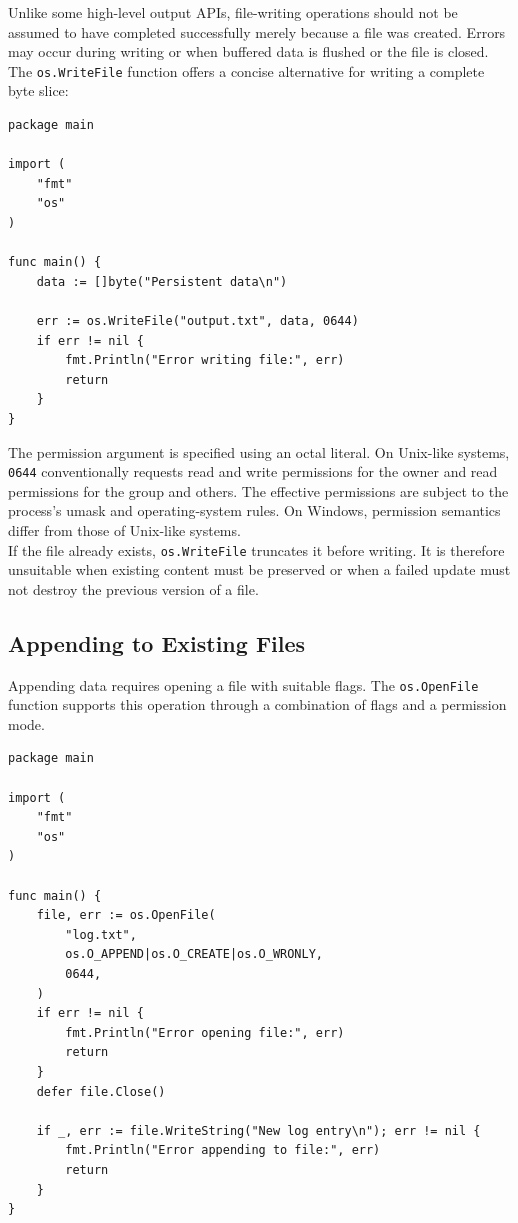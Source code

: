 Unlike some high-level output APIs, file-writing operations should not be assumed to have completed successfully merely because a file was created. Errors may occur during writing or when buffered data is flushed or the file is closed.\\

The \texttt{os.WriteFile} function offers a concise alternative for writing a complete byte slice:

\begin{lstlisting}
package main

import (
    "fmt"
    "os"
)

func main() {
    data := []byte("Persistent data\n")

    err := os.WriteFile("output.txt", data, 0644)
    if err != nil {
        fmt.Println("Error writing file:", err)
        return
    }
}
\end{lstlisting}

The permission argument is specified using an octal literal. On Unix-like systems, \texttt{0644} conventionally requests read and write permissions for the owner and read permissions for the group and others. The effective permissions are subject to the process's umask and operating-system rules. On Windows, permission semantics differ from those of Unix-like systems.\\

If the file already exists, \texttt{os.WriteFile} truncates it before writing. It is therefore unsuitable when existing content must be preserved or when a failed update must not destroy the previous version of a file.\\

\subsection{Appending to Existing Files}

Appending data requires opening a file with suitable flags. The \texttt{os.OpenFile} function supports this operation through a combination of flags and a permission mode.

\begin{lstlisting}
package main

import (
    "fmt"
    "os"
)

func main() {
    file, err := os.OpenFile(
        "log.txt",
        os.O_APPEND|os.O_CREATE|os.O_WRONLY,
        0644,
    )
    if err != nil {
        fmt.Println("Error opening file:", err)
        return
    }
    defer file.Close()

    if _, err := file.WriteString("New log entry\n"); err != nil {
        fmt.Println("Error appending to file:", err)
        return
    }
}
\end{lstlisting}

